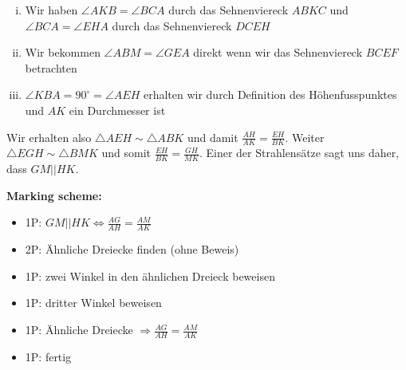 \begin{enumerate}[(i)]
    \item Wir haben $\angle AKB = \angle BCA$ durch das Sehnenviereck $ABKC$ und $\angle BCA = \angle EHA$ durch das Sehnenviereck $DCEH$
    \item Wir bekommen $\angle ABM = \angle GEA$ direkt wenn wir das Sehnenviereck $BCEF$ betrachten
    \item $\angle KBA = 90^\circ = \angle AEH$ erhalten wir durch Definition des Höhenfusspunktes und $AK$ ein Durchmesser ist
\end{enumerate}
Wir erhalten also $\triangle AEH \sim \triangle ABK$ und damit $\frac{AH}{AK} = \frac{EH}{BK}$. Weiter $\triangle EGH \sim \triangle BMK$ und somit $\frac{EH}{BK} = \frac{GH}{MK}$. Einer der Strahlensätze sagt uns daher, dass $GM || HK$.

\bigskip\bigskip

\textbf{Marking scheme:}
\begin{itemize}
\item 1P: $GM || HK \iff \frac{AG}{AH} = \frac{AM}{AK}$
\item 2P: Ähnliche Dreiecke finden (ohne Beweis)
\item 1P: zwei Winkel in den ähnlichen Dreieck beweisen
\item 1P: dritter Winkel beweisen
\item 1P: Ähnliche Dreiecke $\Rightarrow \frac{AG}{AH} = \frac{AM}{AK}$
\item 1P: fertig
\end{itemize}